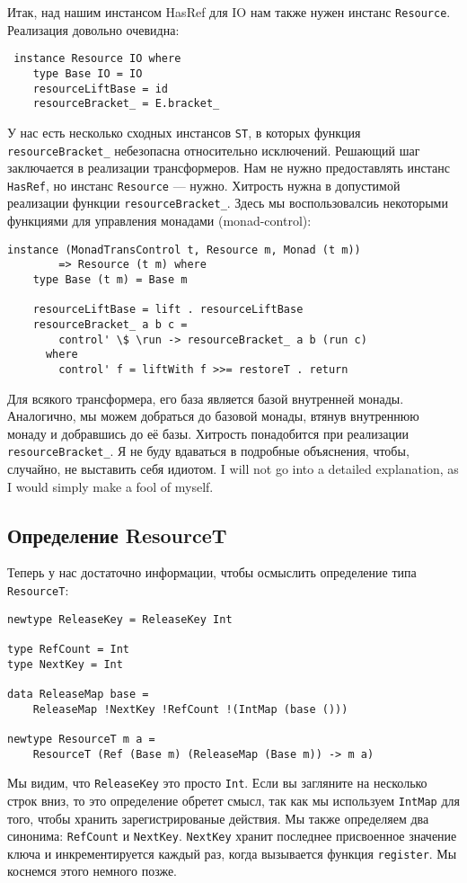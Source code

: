 Итак, над нашим инстансом HasRef для IO нам также нужен инстанс
\lstinline'Resource'. Реализация довольно очевидна:
\begin{lstlisting}
 instance Resource IO where
    type Base IO = IO
    resourceLiftBase = id
    resourceBracket_ = E.bracket_
\end{lstlisting}

У нас есть несколько сходных инстансов \lstinline'ST', в которых функция
\lstinline'resourceBracket_' небезопасна относительно исключений. Решающий шаг заключается
в реализации трансформеров. Нам не нужно
предоставлять инстанс \lstinline'HasRef', но инстанс \lstinline'Resource' --- нужно.
Хитрость нужна в допустимой реализации функции \lstinline'resourceBracket_'. Здесь мы
воспользовалсиь некоторыми функциями для управления монадами (monad-control):

\begin{lstlisting}
instance (MonadTransControl t, Resource m, Monad (t m))
        => Resource (t m) where
    type Base (t m) = Base m

    resourceLiftBase = lift . resourceLiftBase
    resourceBracket_ a b c =
        control' \$ \run -> resourceBracket_ a b (run c)
      where
        control' f = liftWith f >>= restoreT . return 
\end{lstlisting}
Для всякого трансформера, его база является базой внутренней монады. Аналогично, мы можем
добраться до базовой монады, втянув внутреннюю монаду и добравшись до её базы. Хитрость
понадобится при реализации \verb=resourceBracket_=. Я не буду вдаваться в подробные
объяснения, чтобы, случайно, не выставить себя идиотом.
I will not go into a detailed explanation, as I would simply make a fool of myself.

\subsection{Определение ResourceT}

Теперь у нас достаточно информации, чтобы осмыслить определение типа
\lstinline'ResourceT':
\begin{lstlisting}
newtype ReleaseKey = ReleaseKey Int

type RefCount = Int
type NextKey = Int

data ReleaseMap base =
    ReleaseMap !NextKey !RefCount !(IntMap (base ()))

newtype ResourceT m a =
    ResourceT (Ref (Base m) (ReleaseMap (Base m)) -> m a)
\end{lstlisting}
Мы видим, что \lstinline'ReleaseKey' это просто \lstinline'Int'. Если вы загляните на
несколько строк вниз, то
это определение обретет смысл, так как мы используем \lstinline'IntMap' для того, чтобы
хранить
зарегистрированые действия. Мы также определяем два синонима: \lstinline'RefCount' и
\lstinline'NextKey'. \lstinline'NextKey'
хранит последнее присвоенное значение ключа и инкрементируется каждый раз, когда
вызывается функция \verb=register=. Мы коснемся этого немного позже.

